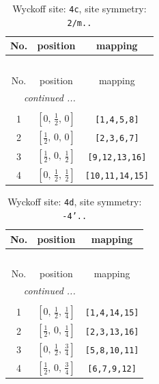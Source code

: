\documentclass[fleqn,8pt]{jsarticle}
\begin{document}
\renewcommand{\arraystretch}{1.2}
\begin{longtable}{ccc}
\caption{Wyckoff site: {\tt 4c}, site symmetry: {\tt 2/m..}}
 \\
 \hline \hline
No. & position & mapping \\ \hline \endfirsthead

\multicolumn{2}{l}{\tablename\ \thetable{}} \\
 \hline \hline
No. & position & mapping \\ \hline \endhead

 \hline \hline
\multicolumn{2}{r}{\footnotesize\it continued ...} \\ \endfoot

 \hline \hline
\multicolumn{2}{r}{} \\ \endlastfoot

1 & $\left[ 0,\, \frac{1}{2},\, 0 \right]$ & {\tt [1,4,5,8]} \\ \hline
2 & $\left[ \frac{1}{2},\, 0,\, 0 \right]$ & {\tt [2,3,6,7]} \\ \hline
3 & $\left[ \frac{1}{2},\, 0,\, \frac{1}{2} \right]$ & {\tt [9,12,13,16]} \\ \hline
4 & $\left[ 0,\, \frac{1}{2},\, \frac{1}{2} \right]$ & {\tt [10,11,14,15]} \\
\end{longtable}
\renewcommand{\arraystretch}{1.2}
\begin{longtable}{ccc}
\caption{Wyckoff site: {\tt 4d}, site symmetry: {\tt -4'..}}
 \\
 \hline \hline
No. & position & mapping \\ \hline \endfirsthead

\multicolumn{2}{l}{\tablename\ \thetable{}} \\
 \hline \hline
No. & position & mapping \\ \hline \endhead

 \hline \hline
\multicolumn{2}{r}{\footnotesize\it continued ...} \\ \endfoot

 \hline \hline
\multicolumn{2}{r}{} \\ \endlastfoot

1 & $\left[ 0,\, \frac{1}{2},\, \frac{1}{4} \right]$ & {\tt [1,4,14,15]} \\ \hline
2 & $\left[ \frac{1}{2},\, 0,\, \frac{1}{4} \right]$ & {\tt [2,3,13,16]} \\ \hline
3 & $\left[ 0,\, \frac{1}{2},\, \frac{3}{4} \right]$ & {\tt [5,8,10,11]} \\ \hline
4 & $\left[ \frac{1}{2},\, 0,\, \frac{3}{4} \right]$ & {\tt [6,7,9,12]} \\
\end{longtable}
\end{document}

